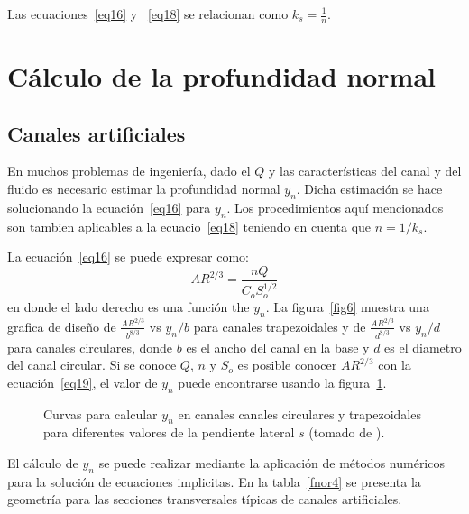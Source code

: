 \documentclass[11pt, oneside]{article}
\begin{document}
Las ecuaciones~\ref{eq16} y ~\ref{eq18} se relacionan como $k_s = \frac{1}{n}$. 

\section{C\'alculo de la profundidad normal} \label{ynorm} %
\subsection{Canales artificiales}
En muchos problemas de ingenier\'ia, dado el $Q$ y las caracter\'isticas del canal y del fluido es necesario estimar la profundidad normal $y_n$. Dicha estimaci\'on se hace solucionando la ecuaci\'on~\ref{eq16} para $y_n$. Los procedimientos aqu\'i mencionados son tambien aplicables a la ecuacio~\ref{eq18} teniendo en cuenta que $n=1/ k_s$.

La ecuaci\'on~\ref{eq16} se puede expresar como:
\begin{equation}
A R^{2/3} = \frac{nQ}{C_o S_o^{1/2}}
\label{eq19}
\end{equation}
en donde el lado derecho es una funci\'on the $y_n$. La figura~\ref{fig6} muestra una grafica de diseño de $\frac{A R^{2/3}}{b^{8/3}}$ vs $y_n / b$ para canales trapezoidales y de $\frac{A R^{2/3}}{d^{8/3}}$ vs $y_n / d$ para canales circulares, donde $b$ es el ancho del canal en la base y $d$ es el diametro del canal circular. Si se conoce $Q$, $n$ y $S_o$ es posible conocer $A R^{2/3}$ con la ecuaci\'on~\ref{eq19}, el valor de $y_n$ puede encontrarse usando la figura~\ref{fig7}. 

\begin{figure}[h]
\centering
\caption{Curvas para calcular $y_n$ en canales canales circulares y trapezoidales para diferentes valores de la pendiente lateral $s$ (tomado de \cite{VChow}).}
\label{fig7}
\end{figure}

El c\'alculo de $y_n$ se puede realizar mediante la aplicaci\'on de m\'etodos num\'ericos para la soluci\'on de ecuaciones implicitas. En la tabla~\ref{fnor4} se presenta la geometr\'ia para las secciones transversales t\'ipicas de canales artificiales.
\end{document}
